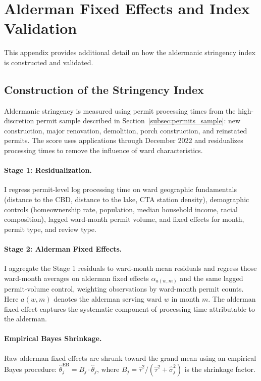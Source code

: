 
\section{Alderman Fixed Effects and Index Validation}
\label{sec:appendix_alderman_fe}

This appendix provides additional detail on how the aldermanic stringency index is constructed and validated.

\subsection{Construction of the Stringency Index}

Aldermanic stringency is measured using permit processing times from the high-discretion permit sample described in Section~\ref{subsec:permits_sample}: new construction, major renovation, demolition, porch construction, and reinstated permits.
The score uses applications through December 2022 and residualizes processing times to remove the influence of ward characteristics.

\paragraph{Stage 1: Residualization.}
I regress permit-level log processing time on ward geographic fundamentals (distance to the CBD, distance to the lake, CTA station density), demographic controls (homeownership rate, population, median household income, racial composition), lagged ward-month permit volume, and fixed effects for month, permit type, and review type.

\paragraph{Stage 2: Alderman Fixed Effects.}
I aggregate the Stage 1 residuals to ward-month mean residuals and regress those ward-month averages on alderman fixed effects $\alpha_{a(w,m)}$ and the same lagged permit-volume control, weighting observations by ward-month permit counts.
Here $a(w,m)$ denotes the alderman serving ward $w$ in month $m$.
The alderman fixed effect captures the systematic component of processing time attributable to the alderman.

\paragraph{Empirical Bayes Shrinkage.}
Raw alderman fixed effects are shrunk toward the grand mean using an empirical Bayes procedure: $\hat{\theta}_j^{\text{EB}} = B_j \cdot \hat{\theta}_j$, where $B_j = \hat{\tau}^2/(\hat{\tau}^2 + \hat{\sigma}_j^2)$ is the shrinkage factor.

